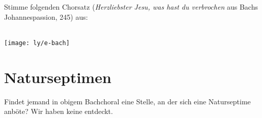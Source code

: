 \documentclass[ngerman,11pt]{scrartcl}
\begin{document}
\begin{aufg}
  Stimme folgenden Chorsatz (\emph{Herzliebster Jesu, was hast du verbrochen}
  aus Bachs Johannespassion,  245) aus:
  \begin{center}
    \\[-\baselineskip]
    \texttt{[image: ly/e-bach]}
  \end{center}%
\end{aufg}

\section{Naturseptimen}

\begin{aufg}
  Findet jemand in obigem Bachchoral eine Stelle, an der sich eine Naturseptime
  anböte? Wir haben keine entdeckt.
\end{aufg}
\end{document}
